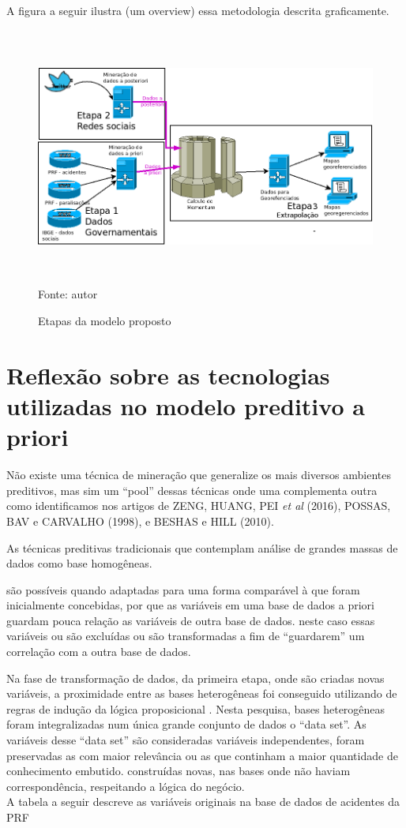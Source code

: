 A figura a seguir ilustra (um overview) essa metodologia descrita graficamente.

\pagebreak

\begin{figure}[ht]
\centering
\caption{Etapas da modelo proposto}
\includegraphics[width=170mm, height=85mm]{Figuras/Metodologia/metodologiaGeral.png}\\
\tiny Fonte: autor
\end{figure}

\section{Reflexão sobre as tecnologias utilizadas no modelo preditivo a priori}\label{result}

Não existe uma técnica de mineração que generalize os mais diversos ambientes preditivos, mas sim um ``pool'' 
dessas técnicas onde uma complementa outra como identificamos nos artigos de ZENG, HUANG, PEI \textit{et al} (2016), 
POSSAS, BAV e CARVALHO (1998), e BESHAS e HILL (2010).

As técnicas preditivas tradicionais que contemplam análise de grandes massas de dados como base homogêneas.

são possíveis quando adaptadas para uma forma comparável à que
foram inicialmente concebidas, por que as variáveis em uma base de dados a priori guardam pouca relação as variáveis de outra base de dados.
neste caso essas variáveis ou são excluídas ou são transformadas a fim de ``guardarem'' um correlação com a outra base de dados. 

Na fase de transformação de dados, da primeira etapa, onde são criadas novas variáveis, a proximidade entre as
bases heterogêneas foi conseguido utilizando de regras de indução da lógica proposicional \cite{NorvigRussel2004}.
Nesta pesquisa, bases heterogêneas foram integralizadas num única grande conjunto de dados o ``data set''. As variáveis desse ``data set''
são consideradas variáveis independentes, foram preservadas as com maior relevância ou as que continham a maior quantidade de conhecimento
embutido.  construídas novas, nas bases onde não haviam correspondência, respeitando a lógica do negócio.\\
A tabela a seguir descreve as variáveis originais na base de dados de acidentes da PRF 

